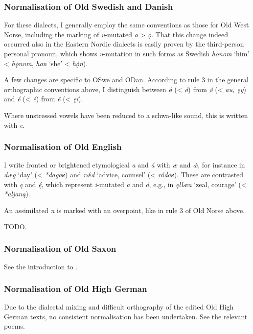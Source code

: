     \subsubsection{Normalisation of Old Swedish and Danish}
    For these dialects, I generally employ the same conventions as those for Old West Norse, including the marking of \emph{u}-mutated \emph{a} > \emph{ǫ}.  That this change indeed occurred also in the Eastern Nordic dialects is easily proven by the third-person personal pronoun, which shows \emph{u}-mutation in such forms as Swedish \emph{honom} ‘him’ < \emph{hǫ̇num}, \emph{hon} ‘she’ < \emph{hǫ̇n}).

    A few changes are specific to OSwe and ODan.  According to rule 3 in the general orthographic conventions above, I distinguish between \emph{ǿ} (< \emph{ǿ}) from \emph{ø̂} (< \emph{au, ęy}) and \emph{é} (< \emph{é}) from \emph{ê} (< \emph{ęi}).

    Where unstressed vowels have been reduced to a schwa-like sound, this is written with \emph{e}.

    \subsubsection{Normalisation of Old English}

    I write fronted or brightened etymological \emph{a} and \emph{á} with \emph{æ} and \emph{ǽ}, for instance in \emph{dæg} ‘day’ (< \emph{*dagaʀ}) and \emph{rǽd} ‘advice, counsel’ (< \emph{rádaʀ}).  These are contrasted with \emph{ę} and \emph{ę́}, which represent \emph{i}-mutated \emph{a} and \emph{á}, e.g., in \emph{ęllæn} ‘zeal, courage’ (< \emph{*aljaną}).

    An assimilated \emph{n} is marked with an overpoint, like in rule 3 of Old Norse above.

    TODO.

    \subsubsection{Normalisation of Old Saxon}

    See the introduction to .

    \subsubsection{Normalisation of Old High German}

    Due to the dialectal mixing and difficult orthography of the edited Old High German texts, no consistent normalisation has been undertaken.  See the relevant poems.


